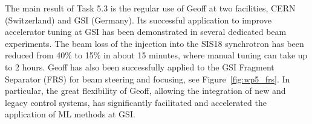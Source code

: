 The main result of Task 5.3 is the regular use of Geoff at two facilities, CERN (Switzerland) and GSI (Germany). Its successful application to improve accelerator tuning at GSI has been demonstrated in several dedicated beam experiments. The beam loss of the injection into the SIS18 synchrotron has been reduced from 40$\%$ to 15$\%$ in about 15 minutes, where manual tuning can take up to 2 hours. Geoff has also been successfully applied to the GSI Fragment Separator (FRS) for beam steering and focusing, see Figure~\ref{fig:wp5_frs}. In particular, the great flexibility of Geoff, allowing the integration of new and legacy control systems, has significantly facilitated and accelerated the application of ML methods at GSI. 

\begin{figure}
    \centering
\end{figure}
